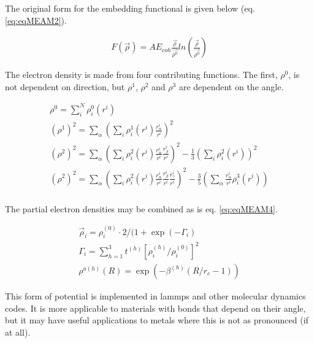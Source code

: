 The original form for the embedding functional is given below (eq. \ref{eq:eqMEAM2})\cite{semiempiricalpots}.

\begin{equation}
\begin{split}
F(\vec{\rho}) = A E_{coh} \frac{\vec{\rho}}{\vec{\rho^0}} ln \left(\frac{\vec{\rho}}{\vec{\rho^0}}\right)
\end{split}
\label{eq:eqMEAM2}
\end{equation}

The electron density is made from four contributing functions.  The first, $\rho^0$, is not dependent on direction, but $\rho^1$, $\rho^2$ and $\rho^3$ are dependent on the angle.

\begin{equation}
\begin{split}
\rho^0 = \sum_i^N \rho_i^0 (r^i) \\
(\rho^1)^2 = \sum_\alpha \left( \sum_i \rho_i^1 (r^i) \frac{r^i_{\alpha}}{r^i} \right)^2 \\
(\rho^2)^2 = \sum_\alpha \left( \sum_i \rho_i^2 (r^i) \frac{r^i_{\alpha}}{r^i}  \frac{r^i_{\beta}}{r^i} \right)^2 - \frac{1}{3} \left(\sum_i \rho_i^2 (r^i) \right)^2 \\
(\rho^2)^2 = \sum_\alpha \left( \sum_i \rho_i^2 (r^i) \frac{r^i_{\alpha}}{r^i}  \frac{r^i_{\beta}}{r^i} \frac{r^i_{\gamma}}{r^i} \right)^2 - \frac{3}{5} \left(\sum_{\alpha} \frac{r^i_{\alpha}}{r^i} \rho_i^3 (r^i) \right) \\
\end{split}
\label{eq:eqMEAM3}
\end{equation}

The partial electron densities may be combined as is eq. \ref{eq:eqMEAM4}\cite{semiempiricalpots}.

\begin{equation}
\begin{split} 
\vec{\rho}_i = \rho_i^{(0)} \cdot 2 / (1 + \exp(-\Gamma_i) \\
\Gamma_i = \sum_{h=1}^3 t^{(h)} \left[ \rho_i^{(h)} / \rho_i^{(0)} \right]^2 \\
\rho^{a(h)}(R) = \exp(-\beta^{(h)} (R/r_e - 1)) 
\end{split}
\label{eq:eqMEAM4}
\end{equation}

This form of potential is implemented in \acrshort{lammps} and other molecular dynamics codes.  It is more applicable to materials with bonds that depend on their angle, but it may have useful applications to metals where this is not as pronounced (if at all).


